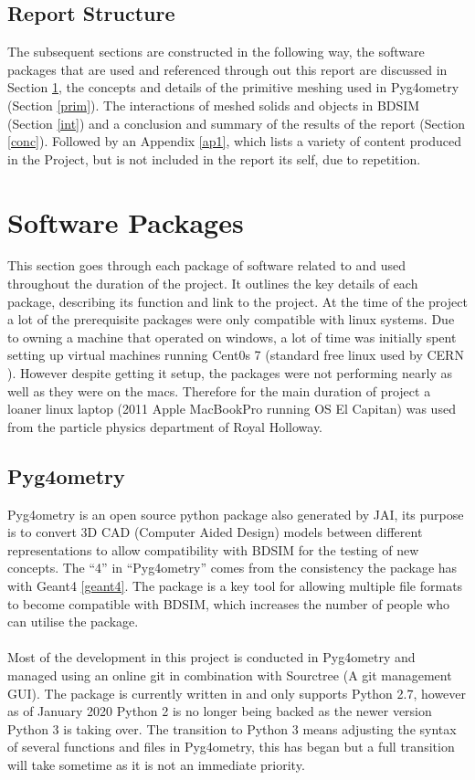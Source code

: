 \documentclass[12pt,a4paper]{article}
\begin{document}
\subsection{Report Structure}
The subsequent sections are constructed in the following way, the software packages that are used and referenced through out this report are discussed in Section \ref{packs}, the concepts and details of the primitive meshing used in Pyg4ometry (Section \ref{prim}). The interactions of meshed solids and objects in BDSIM (Section \ref{int}) and a conclusion and summary of the results of the report (Section \ref{conc}). Followed by an Appendix \ref{ap1}, which lists a variety of content produced in the Project, but is not included in the report its self, due to repetition.



\section{Software Packages}
\label{packs}
This section goes through each package of software related to and used throughout the duration of the project. It outlines the key details of each package, describing its function and link to the project. At the time of the project a lot of the prerequisite packages were only compatible with linux systems. Due to owning a machine that operated on windows, a lot of time was initially spent setting up virtual machines running Cent0s 7 (standard free linux used by CERN \cite{cern}). However despite getting it setup, the packages were not performing nearly as well as they were on the macs. Therefore for the main duration of project a loaner linux laptop (2011 Apple MacBookPro running OS El Capitan) was used from the particle physics department of Royal Holloway. 

\subsection{Pyg4ometry}
\label{pyg}
Pyg4ometry is an open source python package also generated by JAI, its purpose is to convert 3D CAD (Computer Aided Design) models between different representations to allow compatibility with BDSIM for the testing of new concepts. The ``4'' in ``Pyg4ometry'' comes from the consistency the package has with Geant4 \ref{geant4}. The package is a key tool for allowing multiple file formats to become compatible with BDSIM, which increases the number of people who can utilise the package.
\\\\
Most of the development in this project is conducted in Pyg4ometry and managed using an online git in combination with Sourctree (A git management GUI). The package is currently written in and only supports Python 2.7, however as of January 2020 Python 2 is no longer being backed as the newer version Python 3 is taking over. The transition to Python 3 means adjusting the syntax of several functions and files in Pyg4ometry, this has began but a full transition will take sometime as it is not an immediate priority.
\end{document}

